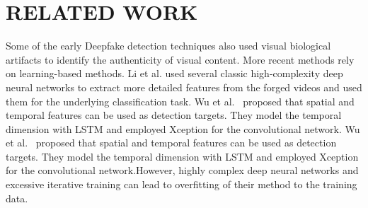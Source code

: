 \section{RELATED WORK}
Some of the early Deepfake detection techniques \cite{yang2019exposing, liy2018exposingaicreated} also used visual biological artifacts to identify the authenticity of visual content. More recent methods  rely on  learning-based methods. Li et al.\cite{li2021exposing} used several classic high-complexity deep neural networks to extract more detailed features from the forged videos and used them for the underlying classification task. Wu et al.~\cite{wu2020sstnet} proposed that spatial and temporal features can be used as detection targets. They model the temporal dimension with LSTM\cite{6795963} and employed  Xception\cite{chollet2017xception} for the convolutional network. Wu et al.~\cite{wu2020sstnet} proposed that spatial and temporal features can be used as detection targets. They model the temporal dimension with LSTM\cite{6795963} and employed  Xception\cite{chollet2017xception} for the convolutional network.However, highly complex deep neural networks and excessive iterative training can lead to overfitting of their method to the training data.